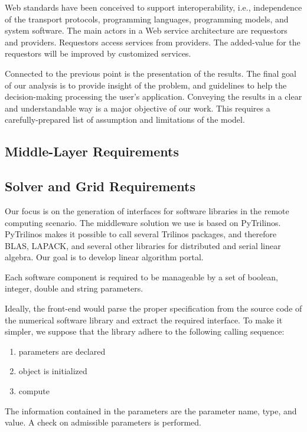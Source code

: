 \documentclass[11pt,relax]{SANDreport}
\begin{document}
Web standards have been conceived to support interoperability, i.e.,
    independence of the transport protocols, programming languages,
    programming models, and system software. The main actors in a Web service
    architecture are requestors and providers. Requestors access services from
    providers. The added-value for the requestors will be improved by
    customized services.

Connected to the previous point is the presentation of the results. The final
goal of our analysis is to provide insight of the problem, and guidelines to
help the decision-making processing the user's application. Conveying the
results in a clear and understandable way is a major objective of our work.
This requires a carefully-prepared list of assumption and limitations of the
model.

\subsection{Middle-Layer Requirements}

\subsection{Solver and Grid Requirements}

Our focus is on the generation of interfaces for software libraries in the
remote computing scenario. The middleware solution we use is based on
PyTrilinos. PyTrilinos makes it possible to call several Trilinos packages,
  and therefore BLAS, LAPACK, and several other libraries for distributed and
  serial linear algebra. Our goal is to develop linear algorithm portal.

Each  software component is  required to be manageable by a set of boolean,
integer, double and string parameters. 

Ideally, the front-end would parse the proper specification from the source
code of the numerical software library and extract the required interface. To
make it simpler, we suppose that the library adhere to the following calling
sequence:
\begin{enumerate}
\item parameters are declared
\item object is initialized
\item compute
\end{enumerate}
The information contained in the parameters are the parameter name, type, and
value. A check on admissible parameters is performed.
\end{document}
